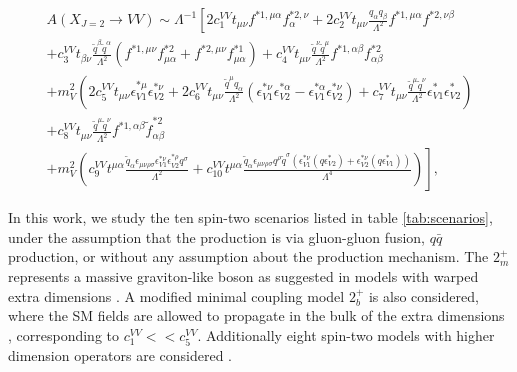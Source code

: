 \begin{multline}
\label{eq:ampl-spin2-a}
A(X_{J=2} \to VV)  \sim \Lambda^{-1} \left [
2 c_{1}^{VV} t_{\mu \nu} f^{*1,\mu \alpha} f^{*2,\nu}_{\alpha}
+ 2 c_{2}^{VV} t_{\mu \nu} \frac{q_\alpha q_\beta }{\Lambda^2} f^{*1,\mu \alpha}  f^{*2,\nu \beta}
\right.   \\
\left.
+ c_{3}^{VV} t_{\beta \nu} \frac{{\tilde q}^\beta {\tilde q}^{\alpha}}{\Lambda^2}
 ( f^{*1,\mu \nu} f^{*2}_{\mu \alpha} + f^{*2,\mu \nu} f^{*1}_{\mu \alpha} )
 + c_{ 4}^{VV}t_{\mu \nu} \frac{{\tilde q}^{\nu} {\tilde q}^\mu}{{\Lambda^2} }  f^{*1,\alpha \beta} f^{*2}_{\alpha \beta}
\right.\\
\left. + m_{V}^2  \left (
2 c_{ 5}^{VV}  t_{\mu\nu} \epsilon_{V1}^{*\mu} \epsilon_{V2}^{*\nu}
+2 c_{ 6}^{VV}  t_{\mu \nu} \frac{{\tilde q}^\mu q_\alpha}{\Lambda^2}
\left ( \epsilon_{V1}^{*\nu} \epsilon_{V2}^{*\alpha} -
\epsilon_{V1}^{*\alpha} \epsilon_{V2}^{*\nu} \right )
+c_{ 7}^{VV} t_{\mu \nu}  \frac{{\tilde q}^\mu {\tilde q}^\nu}{\Lambda^2}  \epsilon^*_{V1} \epsilon^*_{V2}
\right)
\right.  \\
\left.
+c_{ 8}^{VV} t_{\mu \nu} \frac{{\tilde q}^{\mu} {\tilde q}^{\nu}}{\Lambda^2}
  f^{*1,\alpha \beta} {\tilde f}^{*2}_{\alpha \beta}
\right.   \\
 \left.
+  m_{V}^2  \left (
c_{ 9}^{VV} t^{\mu \alpha}
\frac{
{\tilde q}_{\alpha} \epsilon_{\mu \nu \rho \sigma} \epsilon_{V1}^{*\nu} \epsilon_{V2}^{*\rho} q^{\sigma}
}{\Lambda^2}
+c_{ 10}^{VV} t^{\mu \alpha}
\frac{
{\tilde q}_{\alpha} \epsilon_{\mu \nu \rho \sigma} q^\rho {\tilde q}^{\sigma}
\left ( \epsilon_{V1}^{*\nu}(q\epsilon_{V2}^*)+
\epsilon_{V2}^{*\nu}(q\epsilon_{V1}^*) \right )
}{\Lambda^4}
\right )
\right ],
\end{multline}


In this work, we study the ten spin-two scenarios listed in table \ref{tab:scenarios}, under the assumption that the production is via gluon-gluon fusion, $q\bar{q}$ production, or without any assumption about the production mechanism. The $2_m^+$ represents a massive graviton-like boson as suggested in models with warped extra dimensions \cite{Randall:1999vf, Randall:1999ee}. A modified minimal coupling model $2^+_{b}$ is also considered, where the SM fields are allowed to propagate in the bulk of the extra dimensions \cite{Agashe:2007zd}, corresponding to $c_1^{VV} << c_5^{VV}$. Additionally eight spin-two models with higher dimension operators are considered \cite{Khachatryan:2014kca}.

